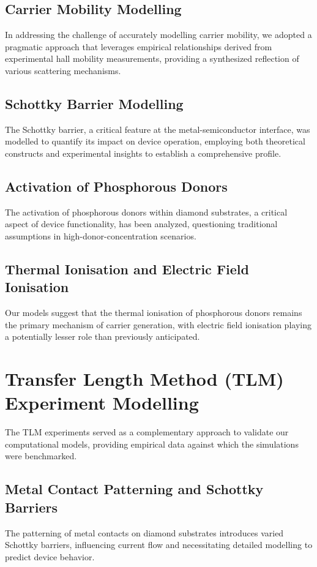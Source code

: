 \subsection{Carrier Mobility Modelling}
In addressing the challenge of accurately modelling carrier mobility, we adopted a pragmatic approach that leverages empirical relationships derived from experimental hall mobility measurements, providing a synthesized reflection of various scattering mechanisms.

\subsection{Schottky Barrier Modelling}
The Schottky barrier, a critical feature at the metal-semiconductor interface, was modelled to quantify its impact on device operation, employing both theoretical constructs and experimental insights to establish a comprehensive profile.

\subsection{Activation of Phosphorous Donors}
The activation of phosphorous donors within diamond substrates, a critical aspect of device functionality, has been analyzed, questioning traditional assumptions in high-donor-concentration scenarios.

\subsection{Thermal Ionisation and Electric Field Ionisation}
Our models suggest that the thermal ionisation of phosphorous donors remains the primary mechanism of carrier generation, with electric field ionisation playing a potentially lesser role than previously anticipated.

\section{Transfer Length Method (TLM) Experiment Modelling}
The TLM experiments served as a complementary approach to validate our computational models, providing empirical data against which the simulations were benchmarked.

\subsection{Metal Contact Patterning and Schottky Barriers}
The patterning of metal contacts on diamond substrates introduces varied Schottky barriers, influencing current flow and necessitating detailed modelling to predict device behavior.

